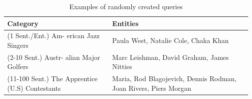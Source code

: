 \documentclass[a4paper]{article}
\newcommand{\figref}[1]{Figure~\ref{#1}}
\newcommand{\tabref}[1]{Table~\ref{#1}}
\newcommand{\appref}[1]{(Appendix~\ref{#1})}
\newcommand{\er}{ESE\xspace}
\newcommand{\nvge}{NVSE\xspace}
\newcommand{\mycite}[1]{\cite{#1}}%
\newcommand{\mynewcite}[1]{\cite{#1}}%
\begin{document}
\begin{table}[t]
  \centering
  \setlength{\tabcolsep}{4pt}
  \begin{tabular}{| p{3cm} | p{4.5cm} |}\hline
    \textbf{Category} & \textbf{Entities}\\[-1pt]\hline
    (1 Sent./Ent.) Am- erican Jazz Singers   & Paula West, Natalie Cole, Chaka Khan \\\hline
     (2-10 Sent.) Austr- alian Major Golfers & Marc Leishman, David Graham, James Nitties\\\hline
     (11-100 Sent.) The Apprentice (U.S) Contestants& Maria, Rod Blagojevich, Dennis Rodman, Joan Rivers, Piers Morgan\\\hline
  \end{tabular}
  \caption{Examples of randomly created queries}
  \label{tab:qex}
\end{table}


\end{document}
